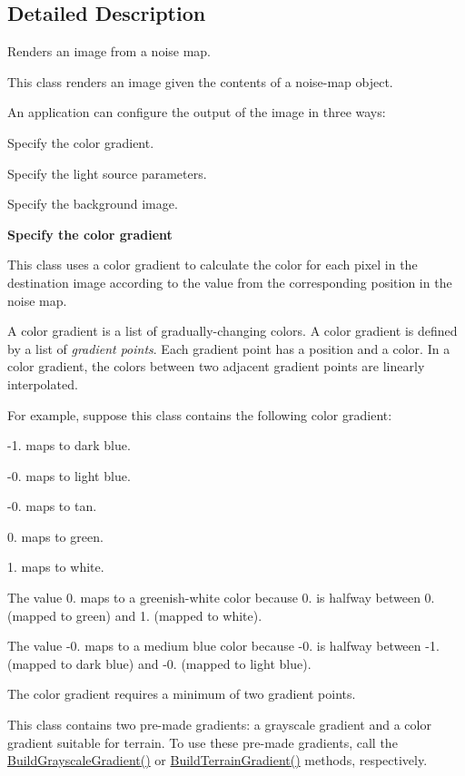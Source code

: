 \subsection{Detailed Description}
Renders an image from a noise map.

This class renders an image given the contents of a noise-\/map object.

An application can configure the output of the image in three ways\+:
\begin{DoxyItemize}
\item Specify the color gradient.
\item Specify the light source parameters.
\item Specify the background image.
\end{DoxyItemize}

{\bfseries Specify the color gradient}

This class uses a color gradient to calculate the color for each pixel in the destination image according to the value from the corresponding position in the noise map.

A color gradient is a list of gradually-\/changing colors. A color gradient is defined by a list of {\itshape gradient points}. Each gradient point has a position and a color. In a color gradient, the colors between two adjacent gradient points are linearly interpolated.

For example, suppose this class contains the following color gradient\+:


\begin{DoxyItemize}
\item -\/1. maps to dark blue.
\item -\/0. maps to light blue.
\item -\/0. maps to tan.
\item 0. maps to green.
\item 1. maps to white.
\end{DoxyItemize}

The value 0. maps to a greenish-\/white color because 0. is halfway between 0. (mapped to green) and 1. (mapped to white).

The value -\/0. maps to a medium blue color because -\/0. is halfway between -\/1. (mapped to dark blue) and -\/0. (mapped to light blue).

The color gradient requires a minimum of two gradient points.

This class contains two pre-\/made gradients\+: a grayscale gradient and a color gradient suitable for terrain. To use these pre-\/made gradients, call the \hyperlink{classnoise_1_1utils_1_1_renderer_image_a142542e27fb5ed45919c0e627a5d0967}{Build\+Grayscale\+Gradient()} or \hyperlink{classnoise_1_1utils_1_1_renderer_image_ab7c7c7127f53bd39390e9e864abbb51e}{Build\+Terrain\+Gradient()} methods, respectively.

